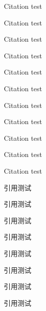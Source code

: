 \documentclass[degree=doctor]{thuthesis}
\begin{document}
\START
\showoutput

Citation \cite{crane1972invisible} test\par
Citation \cite{baker1995future} test\par
Citation \cite{jha2004effect} test\par

Citation \citet{baker1995future} test\par
Citation \citet[42]{baker1995future} test\par
Citation \citep{baker1995future} test\par
Citation \citep[42]{baker1995future} test\par
Citation \citep[see][]{baker1995future} test\par
Citation \citep[see][42]{baker1995future} test\par
Citation \citet*{baker1995future} test\par
Citation \citep*{baker1995future} test\par

引用\citet{wangbing1997dianzi}测试\par
引用\citet[42]{wangbing1997dianzi}测试\par
引用\citep{wangbing1997dianzi}测试\par
引用\citep[42]{wangbing1997dianzi}测试\par
引用\citep[见][]{wangbing1997dianzi}测试\par
引用\citep[见][42]{wangbing1997dianzi}测试\par
引用\citet*{wangbing1997dianzi}测试\par
引用\citep*{wangbing1997dianzi}测试\par

\nocite{*}

\printbibliography

\clearpage
\OMIT
\end{document}
